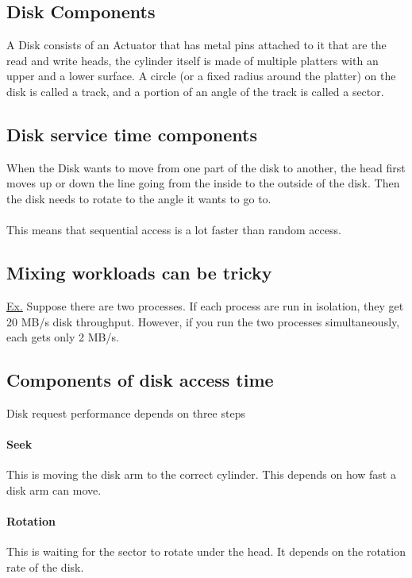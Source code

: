 \documentclass{article}
\begin{document}
\subsection{Disk Components}

A Disk consists of an Actuator that has metal pins attached to it that are the read and write heads, the cylinder itself is made of multiple platters with an upper and a lower surface. A circle (or a fixed radius around the platter) on the disk is called a track, and a portion of an angle of the track is called a sector.

\subsection{Disk service time components}

When the Disk wants to move from one part of the disk to another, the head first moves up or down the line going from the inside to the outside of the disk. Then the disk needs to rotate to the angle it wants to go to.\\
\\
This means that sequential access is a lot faster than random access.

\subsection{Mixing workloads can be tricky}

\underline{Ex.} Suppose there are two processes. If each process are run in isolation, they get 20 MB/s disk throughput. However, if you run the two processes simultaneously, each gets only 2 MB/s.

\subsection{Components of disk access time}

Disk request performance depends on three steps

\paragraph{Seek} This is moving the disk arm to the correct cylinder. This depends on how fast a disk arm can move.

\paragraph{Rotation} This is waiting for the sector to rotate under the head. It depends on the rotation rate of the disk.
\end{document}
